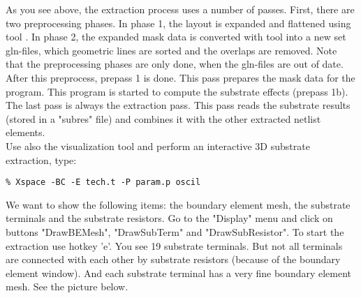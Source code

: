 \normalsize
As you see above, the extraction process uses a number of passes.
First, there are two preprocessing phases.
In phase 1, the layout is expanded and flattened using tool .
In phase 2, the expanded mask data is converted with tool  into a new set gln-files,
which geometric lines are sorted and the overlaps are removed.
Note that the preprocessing phases are only done, when the gln-files are out of date.
After this preprocess, prepass 1 is done.
This pass prepares the mask data for the  program.
This program is started to compute the substrate effects (prepass 1b).
The last pass is always the extraction pass.
This pass reads the substrate results (stored in a "subres" file) and combines it with
the other extracted netlist elements.
\\[1 ex]
Use also the visualization tool  and
perform an interactive 3D substrate extraction, type:
\small
\begin{Verbatim}
% Xspace -BC -E tech.t -P param.p oscil
\end{Verbatim}
\normalsize
We want to show the following items:
the boundary element mesh,
the substrate terminals
and the substrate resistors.
Go to the "Display" menu and click on buttons "DrawBEMesh", "DrawSubTerm" and "DrawSubResistor".
To start the extraction use hotkey 'e'.
You see 19 substrate terminals.
But not all terminals are connected with each other by substrate resistors
(because of the boundary element window).
And each substrate terminal has a very fine boundary element mesh.
See the picture below.
\newpage
\begin{figure}[h]
\centerline{}
\end{figure}

